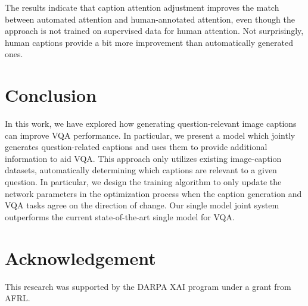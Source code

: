\documentclass[11pt,a4paper]{article}
\begin{document}
The results indicate that caption attention adjustment improves the match between automated attention and human-annotated attention, even though the approach is not trained on supervised data for human attention. Not surprisingly, human captions provide a bit more improvement than automatically generated ones.

\section{Conclusion}
In this work, we have explored how generating question-relevant image captions can improve VQA performance.  In particular, we present a model which jointly generates question-related captions  and uses them to provide additional information to aid VQA. This approach only utilizes existing image-caption datasets, automatically determining which captions are relevant to a given question. In particular, we design the training algorithm to only update the network parameters in the optimization process when the  caption generation and VQA tasks agree on the direction of change. Our single model joint system outperforms the current state-of-the-art single model for VQA. 
\section*{Acknowledgement}
This research was supported by the DARPA XAI program under a grant from AFRL. 


\end{document}
